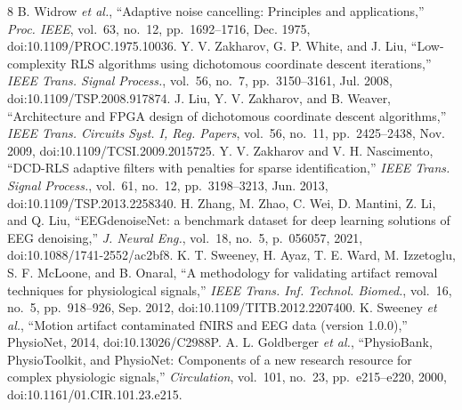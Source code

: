 \documentclass[conference]{IEEEtran}
\begin{document}
\begin{thebibliography}{8}
 B. Widrow \emph{et al.}, ``Adaptive noise cancelling: Principles and applications,'' \emph{Proc. IEEE}, vol.~63, no.~12, pp.~1692--1716, Dec. 1975, doi:10.1109/PROC.1975.10036.
 Y. V. Zakharov, G. P. White, and J. Liu, ``Low-complexity RLS algorithms using dichotomous coordinate descent iterations,'' \emph{IEEE Trans. Signal Process.}, vol.~56, no.~7, pp.~3150--3161, Jul. 2008, doi:10.1109/TSP.2008.917874.
 J. Liu, Y. V. Zakharov, and B. Weaver, ``Architecture and FPGA design of dichotomous coordinate descent algorithms,'' \emph{IEEE Trans. Circuits Syst. I, Reg. Papers}, vol.~56, no.~11, pp.~2425--2438, Nov. 2009, doi:10.1109/TCSI.2009.2015725.
 Y. V. Zakharov and V. H. Nascimento, ``DCD-RLS adaptive filters with penalties for sparse identification,'' \emph{IEEE Trans. Signal Process.}, vol.~61, no.~12, pp.~3198--3213, Jun. 2013, doi:10.1109/TSP.2013.2258340.
 H. Zhang, M. Zhao, C. Wei, D. Mantini, Z. Li, and Q. Liu, ``EEGdenoiseNet: a benchmark dataset for deep learning solutions of EEG denoising,'' \emph{J. Neural Eng.}, vol.~18, no.~5, p.~056057, 2021, doi:10.1088/1741-2552/ac2bf8.
 K. T. Sweeney, H. Ayaz, T. E. Ward, M. Izzetoglu, S. F. McLoone, and B. Onaral, ``A methodology for validating artifact removal techniques for physiological signals,'' \emph{IEEE Trans. Inf. Technol. Biomed.}, vol.~16, no.~5, pp.~918--926, Sep. 2012, doi:10.1109/TITB.2012.2207400.
 K. Sweeney \emph{et al.}, ``Motion artifact contaminated fNIRS and EEG data (version 1.0.0),'' PhysioNet, 2014, doi:10.13026/C2988P.
 A. L. Goldberger \emph{et al.}, ``PhysioBank, PhysioToolkit, and PhysioNet: Components of a new research resource for complex physiologic signals,'' \emph{Circulation}, vol.~101, no.~23, pp.~e215--e220, 2000, doi:10.1161/01.CIR.101.23.e215.
\end{thebibliography}
\end{document}
